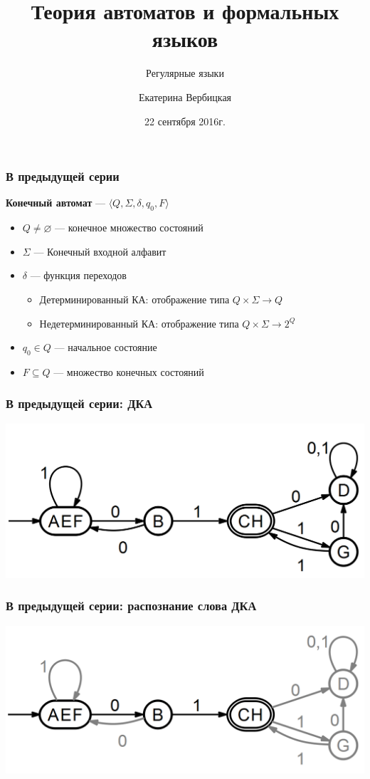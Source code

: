 \documentclass{beamer}
\title[]{Теория автоматов и формальных языков}
\subtitle[]{Регулярные языки}
\institute[]{
Санкт-Петербургский государственный электротехнический университет <<ЛЭТИ>>\\
}
\author[]{Екатерина Вербицкая}
\date{22 сентября 2016г.}
\begin{document}
{
  \begin{frame}
    \titlepage
  \end{frame}
}


\begin{frame}[fragile]
  \transwipe[direction=90]
  \frametitle{В предыдущей серии}
  \textbf{Конечный автомат} --- $\langle Q, \Sigma, \delta, q_0, F \rangle$
  \begin{itemize}
    \item $Q \neq \varnothing$ --- конечное множество состояний
    \item $\Sigma$ --- Конечный входной алфавит
    \item $\delta$ --- функция переходов
    \begin{itemize}
      \item Детерминированный КА: отображение типа $Q \times \Sigma \rightarrow Q$
      \item Недетерминированный КА: отображение типа $Q \times \Sigma \rightarrow 2^Q$
    \end{itemize}
    \item $q_0 \in Q$ --- начальное состояние
    \item $F \subseteq Q$ --- множество конечных состояний
  \end{itemize}
\end{frame}

\begin{frame}[fragile]
  \transwipe[direction=90]
  \frametitle{В предыдущей серии: ДКА}
  \begin{center}
  \includegraphics[width=\textwidth]{pics/det.png}  
  \end{center}
\end{frame}

\begin{frame}[fragile]
  \transwipe[direction=90]
  \frametitle{В предыдущей серии: распознание слова ДКА}
  \begin{center}
  \includegraphics[width=\textwidth]{pics/path1.png}  
  \end{center}
\end{frame}
\end{document}
